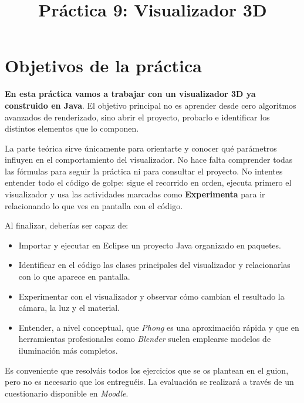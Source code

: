 \documentclass[
  spanish,
  11pt,
  a4paper,
  DIV=11,
  numbers=noendperiod]{scrartcl}
\title{Práctica 9: Visualizador 3D}
\author{}
\date{}
\providecommand{\tightlist}{%
  \setlength{\itemsep}{0pt}\setlength{\parskip}{0pt}}
\renewcommand*\contentsname{Tabla de contenidos}
\newcommand\contentsname{Tabla de contenidos}
\begin{document}
\maketitle

\renewcommand*\contentsname{Tabla de contenidos}
{
\hypersetup{linkcolor=}
\setcounter{tocdepth}{2}
\tableofcontents
}

\clearpage

\section{Objetivos de la práctica}

\label{objetivos-de-la-práctica}

\textbf{En esta práctica vamos a trabajar con un visualizador 3D ya construido en Java}. El objetivo principal no es aprender desde cero algoritmos avanzados de renderizado, sino abrir el proyecto, probarlo e identificar los distintos elementos que lo componen.

La parte teórica sirve únicamente para orientarte y conocer qué parámetros influyen en el comportamiento del visualizador. No hace falta comprender todas las fórmulas para seguir la práctica ni para consultar el proyecto. No intentes entender todo el código de golpe: sigue el recorrido en orden, ejecuta primero el visualizador y usa las actividades marcadas como \textbf{Experimenta} para ir relacionando lo que ves en pantalla con el código.

Al finalizar, deberías ser capaz de:

\begin{itemize}
\tightlist
\item
  Importar y ejecutar en Eclipse un proyecto Java organizado en paquetes.
\item
  Identificar en el código las clases principales del visualizador y relacionarlas con lo que aparece en pantalla.
\item
  Experimentar con el visualizador y observar cómo cambian el resultado la cámara, la luz y el material.
\item
  Entender, a nivel conceptual, que \emph{Phong} es una aproximación rápida y que en herramientas profesionales como \emph{Blender} suelen emplearse modelos de iluminación más completos.
\end{itemize}

Es conveniente que resolváis todos los ejercicios que se os plantean en el guion, pero no es necesario que los entreguéis. La evaluación se realizará a través de un cuestionario disponible en \emph{Moodle}.
\end{document}
